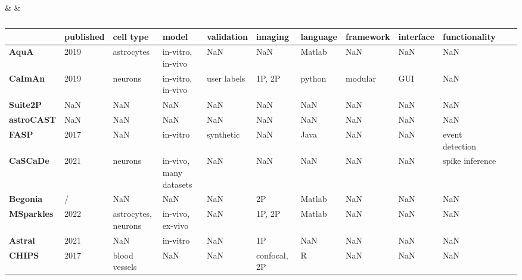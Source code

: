 \hline \textbf{} &  &  \\

\bgroup
\def\arraystretch{1.3}
\begin{table}[htb]
    \centering
    \caption{\newline}
    \label{tab:transposed-comparison}
    \begin{tabular}{|l|l|l|l|l|l|l|l|l|l|l|l|}
    \hline {} & \textbf{published} & \textbf{cell type} & \textbf{model} & \textbf{validation} & \textbf{imaging} & \textbf{language} & \textbf{framework} & \textbf{interface} & \textbf{functionality} \\
    \hline \textbf{AquA} & 2019 & astrocytes & \makecell{in-vitro,\\in-vivo} & NaN & NaN & Matlab & NaN & NaN & NaN \\
    \hline \textbf{CaImAn} & 2019 & neurons & \makecell{in-vitro,\\in-vivo} & user labels & 1P, 2P & python & modular & GUI & NaN \\
    \hline \textbf{Suite2P} & NaN & NaN & NaN & NaN & NaN & NaN & NaN & NaN & NaN \\
    \hline \textbf{astroCAST} & NaN & NaN & NaN & NaN & NaN & NaN & NaN & NaN & NaN \\
    \hline \textbf{FASP} & 2017 & NaN & in-vitro & synthetic & NaN & Java & NaN & NaN & event detection \\
    \hline \textbf{CaSCaDe} & 2021 & neurons & \makecell{in-vivo,\\many datasets} & NaN & NaN & NaN & NaN & NaN & spike inference \\
    \hline \textbf{Begonia} & / & NaN & NaN & NaN & 2P & Matlab & NaN & NaN & NaN \\
    \hline \textbf{MSparkles} & 2022 & \makecell{astrocytes,\\neurons} & \makecell{in-vivo,\\ex-vivo} & NaN & 1P, 2P & Matlab & NaN & NaN & NaN \\
    \hline \textbf{Astral} & 2021 & NaN & in-vitro & NaN & 1P & NaN & NaN & NaN & NaN \\
    \hline \textbf{CHIPS} & 2017 & blood vessels & NaN & NaN & confocal, 2P & R & NaN & NaN & NaN \\
    \hline
    \end{tabular}
\end{table}
\egroup


